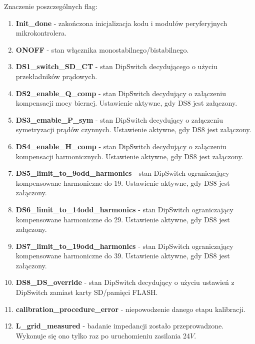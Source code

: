 \documentclass[12pt,a4paper]{article}
\begin{document}
Znaczenie poszczególnych flag:
\begin{enumerate}
	\setlength\itemsep{0mm}
	\item \textbf{Init\_done} - zakończona inicjalizacja kodu i modułów peryferyjnych mikrokontrolera.
	
	\item \textbf{ONOFF} - stan włącznika monostabilnego/bistabilnego.
	
	\item \textbf{DS1\_switch\_SD\_CT} - stan DipSwitch decydującego o użyciu przekładników prądowych.
	
	\item \textbf{DS2\_enable\_Q\_comp} - stan DipSwitch decydujący o załączeniu kompensacji mocy biernej. Ustawienie aktywne, gdy DS8 jest załączony.
	
	\item \textbf{DS3\_emable\_P\_sym} - stan DipSwitch decydujący o załączeniu symetryzacji prądów czynnych. Ustawienie aktywne, gdy DS8 jest załączony.
	
	\item \textbf{DS4\_enable\_H\_comp} - stan DipSwitch decydujący o załączeniu kompensacji harmonicznych. Ustawienie aktywne, gdy DS8 jest załączony.
	
	\item \textbf{DS5\_limit\_to\_9odd\_harmonics} - stan DipSwitch ograniczający kompensowane harmoniczne do 19. Ustawienie aktywne, gdy DS8 jest załączony.
	
	\item \textbf{DS6\_limit\_to\_14odd\_harmonics} - stan DipSwitch ograniczający kompensowane harmoniczne do 29. Ustawienie aktywne, gdy DS8 jest załączony.
	
	\item \textbf{DS7\_limit\_to\_19odd\_harmonics} - stan DipSwitch ograniczający kompensowane harmoniczne do 39. Ustawienie aktywne, gdy DS8 jest załączony.
	
	\item \textbf{DS8\_DS\_override} - stan DipSwitch decydujący o użyciu ustawień z DipSwitch zamiast karty SD/pamięci FLASH.
		
	\item \textbf{calibration\_procedure\_error} - niepowodzenie danego etapu kalibracji.
	
	\item \textbf{L\_grid\_measured} - badanie impedancji zostało przeprowadzone. Wykonuje się ono tylko raz po uruchomieniu zasilania 24$V$.
		

\end{enumerate}
\end{document}
